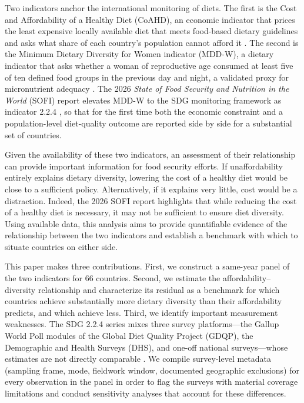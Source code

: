 \documentclass[11pt]{article}
\begin{document}
Two indicators anchor the international monitoring of diets. The first is the Cost and Affordability of a Healthy Diet (CoAHD), an economic indicator that prices the least expensive locally available diet that meets food-based dietary guidelines and asks what share of each country's population cannot afford it \citep{herforth2020, bai2021}. The second is the Minimum Dietary Diversity for Women indicator (MDD-W), a dietary indicator that asks whether a woman of reproductive age consumed at least five of ten defined food groups in the previous day and night, a validated proxy for micronutrient adequacy \citep{arimond2010, martinprevel2015, fao2021}. The 2026 \emph{State of Food Security and Nutrition in the World} (SOFI) report elevates MDD-W to the SDG monitoring framework as indicator 2.2.4 \citep{fao2026}, so that for the first time both the economic constraint and a population-level diet-quality outcome are reported side by side for a substantial set of countries.

Given the availability of these two indicators, an assessment of their relationship can provide important information for food security efforts. If unaffordability entirely explains dietary diversity, lowering the cost of a healthy diet would be close to a sufficient policy.  Alternatively, if it explains very little, cost would be a distraction. Indeed, the 2026 SOFI report highlights that while reducing the cost of a healthy diet is necessary, it may not be sufficient to ensure diet diversity.  Using available data, this analysis aims to provide quantifiable evidence of the relationship between the two indicators and establish a benchmark with which to situate countries on either side.

This paper makes three contributions. First, we construct a same-year panel of the two indicators for 66 countries. Second, we estimate the affordability--diversity relationship and characterize its residual as a benchmark for which countries achieve substantially more dietary diversity than their affordability predicts, and which achieve less. Third, we identify important measurement weaknesses. The SDG 2.2.4 series mixes three survey platforms---the Gallup World Poll modules of the Global Diet Quality Project (GDQP), the Demographic and Health Surveys (DHS), and one-off national surveys---whose estimates are not directly comparable \citep{hanleycook2025}. We compile survey-level metadata (sampling frame, mode, fieldwork window, documented geographic exclusions) for every observation in the panel in order to flag the surveys with material coverage limitations and conduct sensitivity analyses that account for these differences.
\end{document}
